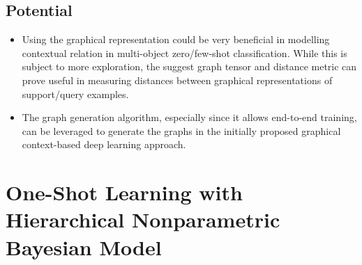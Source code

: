 \documentclass{article}
\begin{document}
\subsection{Potential}
\begin{itemize}
    \item Using the graphical representation could be very beneficial in modelling contextual relation in multi-object zero/few-shot classification. While this is subject to more exploration, the suggest graph tensor and distance metric can prove useful in measuring distances between graphical representations of support/query examples.
    \item The graph generation algorithm, especially since it allows end-to-end training, can be leveraged to generate the graphs in the initially proposed graphical context-based deep learning approach.
\end{itemize}

\section{One-Shot Learning with Hierarchical Nonparametric Bayesian Model \cite{pmlr-v27-salakhutdinov12a}}
\end{document}
